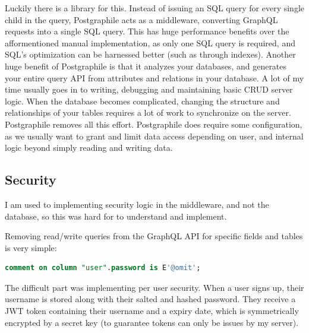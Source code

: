\documentclass{l4proj}
\begin{document}
Luckily there is a library for this. Instead of issuing an SQL query for every single child in the query, Postgraphile acts as a middleware, converting GraphQL requests into a single SQL query. This has huge performance benefits over the afformentioned manual implementation, as only one SQL query is required, and SQL's optimization can be harnessed better (such as through indexes). Another huge benefit of Postgraphile is that it analyzes your databases, and generates your entire query API from attributes and relations in your database. A lot of my time usually goes in to writing, debugging and maintaining basic CRUD server logic. When the database becomes complicated, changing the structure and relationships of your tables requires a lot of work to synchronize on the server. Postgraphile removes all this effort. Postgraphile does require some configuration, as we usually want to grant and limit data access depending on user, and internal logic beyond simply reading and writing data. 


\subsection{Security}
I am used to implementing security logic in the middleware, and not the database, so this was hard for to understand and implement. 

Removing read/write queries from the GraphQL API for specific fields and tables is very simple:

\begin{lstlisting}[language=SQL, caption={This comment tells Postgraphile to omit password fields} ]
comment on column "user".password is E'@omit';
\end{lstlisting}

The difficult part was implementing per user security. When a user signs up, their username is stored along with their salted and hashed password. They receive a JWT token containing their username and a expiry date, which is symmetrically encrypted by a secret key (to guarantee tokens can only be issues by my server). 
\end{document}
